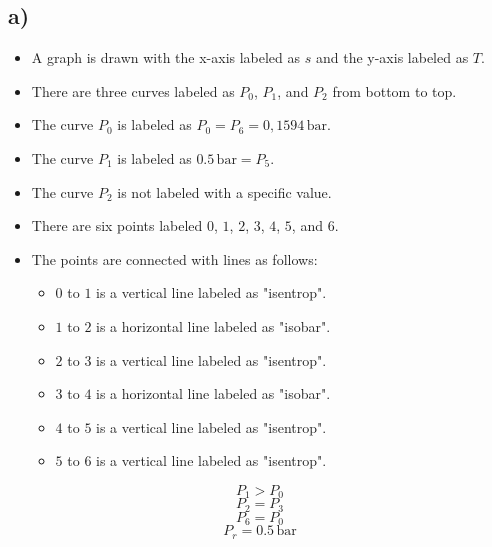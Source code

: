 

\subsection*{a)}

\begin{itemize}
    \item A graph is drawn with the x-axis labeled as $s$ and the y-axis labeled as $T$.
    \item There are three curves labeled as $P_0$, $P_1$, and $P_2$ from bottom to top.
    \item The curve $P_0$ is labeled as $P_0 = P_6 = 0,1594 \, \text{bar}$.
    \item The curve $P_1$ is labeled as $0.5 \, \text{bar} = P_5$.
    \item The curve $P_2$ is not labeled with a specific value.
    \item There are six points labeled $0$, $1$, $2$, $3$, $4$, $5$, and $6$.
    \item The points are connected with lines as follows:
        \begin{itemize}
            \item $0$ to $1$ is a vertical line labeled as "isentrop".
            \item $1$ to $2$ is a horizontal line labeled as "isobar".
            \item $2$ to $3$ is a vertical line labeled as "isentrop".
            \item $3$ to $4$ is a horizontal line labeled as "isobar".
            \item $4$ to $5$ is a vertical line labeled as "isentrop".
            \item $5$ to $6$ is a vertical line labeled as "isentrop".
        \end{itemize}
\end{itemize}

\[
P_1 > P_0
\]
\[
P_2 = P_3
\]
\[
P_6 = P_0
\]
\[
P_r = 0.5 \, \text{bar}
\]